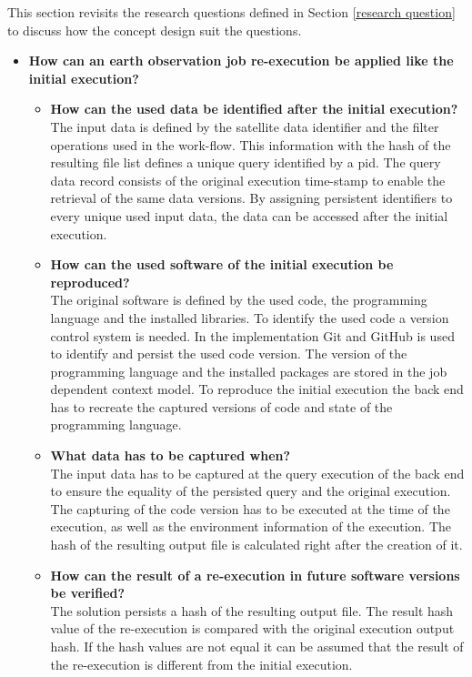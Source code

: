 \documentclass[draft,final]{vutinfth} %
\begin{document}
This section revisits the research questions defined in Section \ref{research question} to discuss how the concept design suit the questions.

\begin{itemize}
	\item \textbf{How can an earth observation job re-execution be applied like the initial execution?}
	\begin{itemize}
		\item \textbf{How can the used data be identified after the initial execution?} \\
		The input data is defined by the satellite data identifier and the filter operations used in the work-flow. This information with the hash of the resulting file list defines a unique query identified by a pid. The query data record consists of the original execution time-stamp to enable the retrieval of the same data versions. By assigning persistent identifiers to every unique used input data, the data can be accessed after the initial execution.    
		\item \textbf{How can the used software of the initial execution be reproduced?} \\
		The original software is defined by the used code, the programming language and the installed libraries. To identify the used code a version control system is needed. In the implementation Git and GitHub is used to identify and persist the used code version. The version of the programming language and the installed packages are stored in the job dependent context model. To reproduce the initial execution the back end has to recreate the captured versions of code and state of the programming language.       
		\item \textbf{What data has to be captured when?} \\
		The input data has to be captured at the query execution of the back end to ensure the equality of the persisted query and the original execution. The capturing of the code version has to be executed at the time of the execution, as well as the environment information of the execution. The hash of the resulting output file is calculated right after the creation of it.  
		\item \textbf{How can the result of a re-execution in future software versions be verified?} \\
		The solution persists a hash of the resulting output file. The result hash value of the re-execution is compared with the original execution output hash. If the hash values are not equal it can be assumed that the result of the re-execution is different from the initial execution. 

\end{itemize}
\end{itemize}
\end{document}
